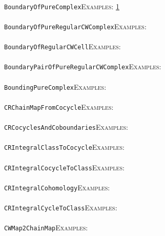\documentclass[a4paper,11pt]{report}
\begin{document}
{{ \\
 \texttt{BoundaryOfPureComplex}{\nobreakspace}{\nobreakspace}{\nobreakspace}{\nobreakspace}\textsc{Examples:} \href{../www/SideLinks/About/aboutPeripheral.html} {1}{\nobreakspace} \\
 \\
 \texttt{BoundaryOfPureRegularCWComplex}{\nobreakspace}{\nobreakspace}{\nobreakspace}{\nobreakspace}\textsc{Examples:} \\
 \\
 \texttt{BoundaryOfRegularCWCell}{\nobreakspace}{\nobreakspace}{\nobreakspace}{\nobreakspace}\textsc{Examples:} \\
 \\
 \texttt{BoundaryPairOfPureRegularCWComplex}{\nobreakspace}{\nobreakspace}{\nobreakspace}{\nobreakspace}\textsc{Examples:} \\
 \\
 \texttt{BoundingPureComplex}{\nobreakspace}{\nobreakspace}{\nobreakspace}{\nobreakspace}\textsc{Examples:} \\
 \\
 \texttt{CR{\textunderscore}ChainMapFromCocycle}{\nobreakspace}{\nobreakspace}{\nobreakspace}{\nobreakspace}\textsc{Examples:} \\
 \\
 \texttt{CR{\textunderscore}CocyclesAndCoboundaries}{\nobreakspace}{\nobreakspace}{\nobreakspace}{\nobreakspace}\textsc{Examples:} \\
 \\
 \texttt{CR{\textunderscore}IntegralClassToCocycle}{\nobreakspace}{\nobreakspace}{\nobreakspace}{\nobreakspace}\textsc{Examples:} \\
 \\
 \texttt{CR{\textunderscore}IntegralCocycleToClass}{\nobreakspace}{\nobreakspace}{\nobreakspace}{\nobreakspace}\textsc{Examples:} \\
 \\
 \texttt{CR{\textunderscore}IntegralCohomology}{\nobreakspace}{\nobreakspace}{\nobreakspace}{\nobreakspace}\textsc{Examples:} \\
 \\
 \texttt{CR{\textunderscore}IntegralCycleToClass}{\nobreakspace}{\nobreakspace}{\nobreakspace}{\nobreakspace}\textsc{Examples:} \\
 \\
 \texttt{CWMap2ChainMap}{\nobreakspace}{\nobreakspace}{\nobreakspace}{\nobreakspace}\textsc{Examples:} \\
 \\
}}
\end{document}
